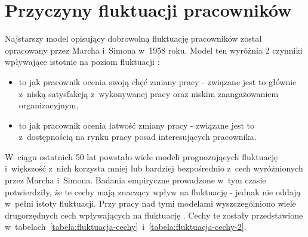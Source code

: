 \clearpage


\section{Przyczyny fluktuacji pracowników}\label{sec:czynniki-wplywajace-na-fluktuacje}

Najstarszy model opisujący dobrowolną fluktuację pracowników został opracowany przez Marcha i~Simona w~1958 roku.
Model ten wyróżnia 2 czynniki wpływające istotnie na poziom fluktuacji \cite{wozniak-2012}:
\begin{itemize}
    \item to jak pracownik ocenia swoją chęć zmiany pracy - związane jest to głównie z~niską satysfakcją z~wykonywanej pracy oraz niskim zaangażowaniem organizacyjnym,
    \item to jak pracownik ocenia łatwość zmiany pracy - związane jest to z~dostępnością na rynku pracy posad interesujących pracownika.
\end{itemize}

W~ciągu ostatnich 50 lat powstało wiele modeli prognozujących fluktuację i~większość z~nich korzysta mniej lub bardziej bezpośrednio z~cech wyróżnionych przez Marcha i~Simona.
Badania empiryczne prowadzone w~tym czasie potwierdziły, że te cechy mają znaczący wpływ na fluktuację - jednak nie oddają w~pełni istoty fluktuacji.
Przy pracy nad tymi modelami wyszczególniono wiele drugorzędnych cech wpływających na fluktuację \cite{steel-2009}.
Cechy te zostały przedstawione w~tabelach~\ref{tabela:fluktuacja-cechy}~i~\ref{tabela:fluktuacja-cechy-2}.


